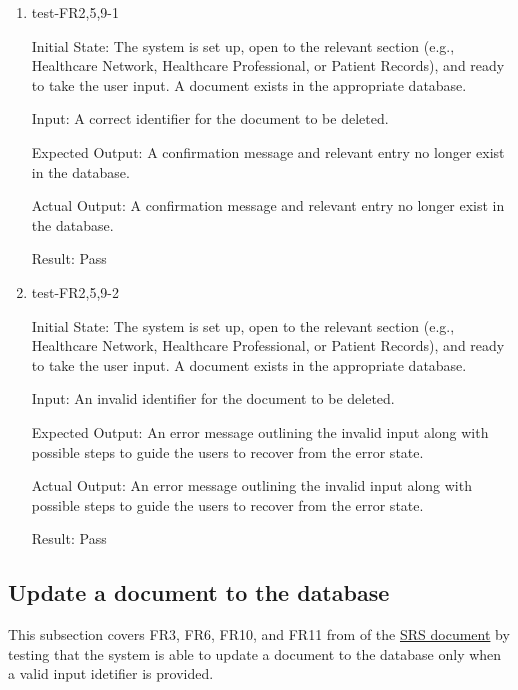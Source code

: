\documentclass[12pt, titlepage]{article}
\begin{document}
\begin{enumerate}

  \item{test-FR2,5,9-1} \label{test-FR2,5,9-1}
  
  Initial State: The system is set up, open to the relevant section (e.g., Healthcare Network, Healthcare Professional, or Patient Records), and ready to take the user input. A document exists in the appropriate database.

  Input: A correct identifier for the document to be deleted.

  Expected Output: A confirmation message and relevant entry no longer exist in the database.

  Actual Output: A confirmation message and relevant entry no longer exist in the database.

  Result: Pass


  \item{test-FR2,5,9-2} \label{test-FR2,5,9-2}

  Initial State: The system is set up, open to the relevant section (e.g., Healthcare Network, Healthcare Professional, or Patient Records), and ready to take the user input. A document exists in the appropriate database.

  Input: An invalid identifier for the document to be deleted.

  Expected Output: An error message outlining the invalid input along with possible steps to guide the users to recover from the error state.

  Actual Output: An error message outlining the invalid input along with possible steps to guide the users to recover from the error state.

  Result: Pass

\end{enumerate}

\subsection{Update a document to the database} \label{section:3.3}

This subsection covers FR3, FR6, FR10, and FR11 from of the \href{https://github.com/Inreet-Kaur/capstone/blob/main/docs/SRS/SRS.pdf}{SRS document} by testing that the system is able to update a document to the database only when a valid input idetifier is provided.
\end{document}
